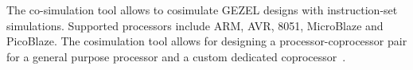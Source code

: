 The co-simulation tool allows to cosimulate GEZEL designs with
instruction-set simulations. Supported processors include
ARM, AVR, 8051, MicroBlaze and PicoBlaze. The cosimulation tool allows
for designing a processor-coprocessor pair for a general purpose
processor and a custom dedicated coprocessor~\cite{Schaumont}.

